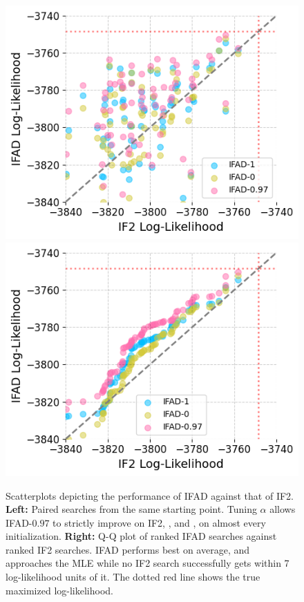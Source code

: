 \documentclass[9pt,twocolumn,pnasresearcharticle]{pnas-new}
\newcommand\arxiv[2]{#2} %
\begin{document}
\begin{figure}[htbp!]
    \includegraphics[width=\arxiv{8cm}{\textwidth/\real{4.2}}]{imgs/095/pairs.png}
    \includegraphics[width=\arxiv{8cm}{\textwidth/\real{4.2}}]{imgs/095/qq.png}
    \caption{Scatterplots depicting the performance of IFAD against that of IF2. \textbf{Left:} Paired searches from the same starting point. Tuning $\alpha$ allows IFAD-$0.97$ to strictly improve on IF2, \cite{poyiadjis11}, and \cite{naesseth18}, on almost every initialization. \textbf{Right:} Q-Q plot of ranked IFAD searches against ranked IF2 searches. IFAD performs best on average, and approaches the MLE while no IF2 search successfully gets within 7 log-likelihood units of it. The dotted red line shows the true maximized log-likelihood. }
    \label{fig:scatter}
    \arxiv{}{\vspace*{-4mm}}
\end{figure}
\end{document}
